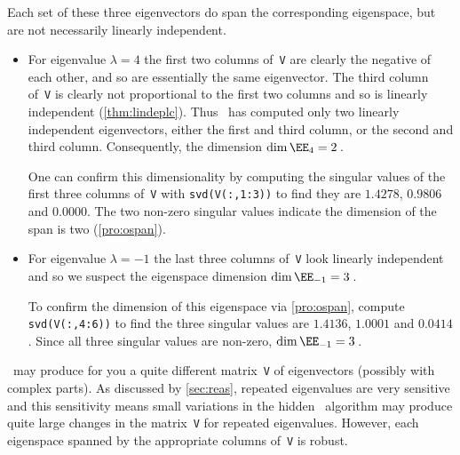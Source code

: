 \begin{example}
\begin{solution}
Each set of these three eigenvectors do span the corresponding eigenspace, but are not necessarily linearly independent.
\begin{itemize}
\item For eigenvalue \(\lambda=4\) the first two columns of~\verb|V| are clearly the negative of each other, and so are essentially the same eigenvector.  
The third column of~\verb|V| is clearly not proportional to the first two columns and so is linearly independent (\autoref{thm:lindeplc}).
Thus \script\ has computed only two linearly independent eigenvectors, either the first and third column, or the second and third column.
Consequently, the dimension \(\dim\EE_4=2\)\,.

One can confirm this dimensionality by computing the singular values of the first three columns of~\verb|V| with \verb|svd(V(:,1:3))| to find they are \(1.4278\), \(0.9806\) and \(0.0000\).
The two non-zero singular values indicate the dimension of the span is two (\autoref{pro:ospan}).

\item For eigenvalue \(\lambda=-1\) the last three columns of~\verb|V| look linearly independent and so we suspect the eigenspace dimension \(\dim\EE_{-1}=3\)\,.

To confirm the dimension of this eigenspace via \autoref{pro:ospan}, compute \verb|svd(V(:,4:6))| to find the three singular values are \(1.4136\), \(1.0001\) and \(0.0414\).
Since all three singular values are non-zero, \(\dim\EE_{-1}=3\)\,.
\end{itemize}
\end{solution}
\script\ may produce for you a quite different matrix~\verb|V| of eigenvectors (possibly with complex parts). 
As discussed by \autoref{sec:reas}, repeated eigenvalues are very sensitive and this sensitivity means small variations in the hidden \script\ algorithm may produce quite large changes in the matrix~\verb|V| for repeated eigenvalues.
However, each eigenspace spanned by the appropriate columns of~\verb|V| is robust.
\end{example}





